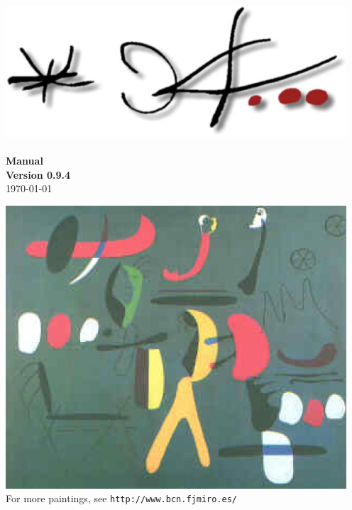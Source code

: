 \documentclass[10pt]{book}
\begin{document}

\thispagestyle{empty}
\begin{center}
  \vfill
  \includegraphics[width=5in]{signature}\\
  \vspace{30 mm}
  {\Xbombastic \miro}\\
  \vspace{10 mm}
  {\LARGE \textbf{Manual}}\\
  \vspace{10 mm}
  \textbf{Version 0.9.4}\\
  \vspace{10 mm}
  \today\\
  \vfill
\end{center}

\newpage

\begin{center}
  \includegraphics[width=5in]{pincolla}
  \bigskip
  For more paintings, see {\tt http://www.bcn.fjmiro.es/}
\end{center}
\end{document}
